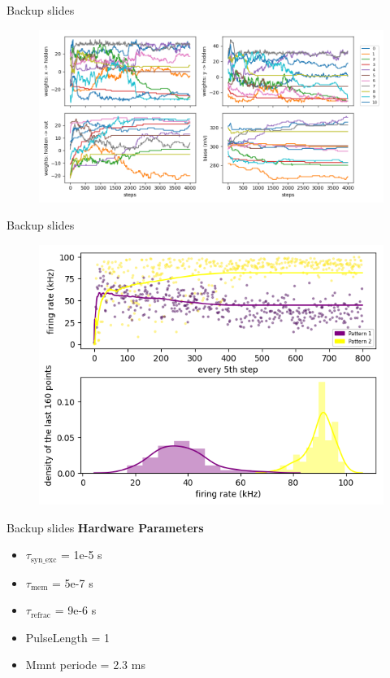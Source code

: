 \documentclass[12pt, aspectratio=169]{beamer}
\begin{document}
\appendix

\begin{frame}[fragile]{Backup slides}
\centering
        \begin{figure}
            \includegraphics[scale=0.5]{model_parameters.png}
            \label{fig:my_label}
        \end{figure}
\end{frame}

\begin{frame}[fragile]{Backup slides}
\centering
        \begin{figure}
            \includegraphics[scale=0.65]{rates_dist.png}
            \label{fig:my_label}
        \end{figure}
\end{frame}

\begin{frame}[fragile]{Backup slides}
\textbf{Hardware Parameters}
\begin{itemize}
    \item $\tau_{\text{syn\_exc}}$ = 1e-5 s
    \item $\tau_{\text{mem}}$ = 5e-7 s
    \item $\tau_{\text{refrac}}$ = 9e-6 s
    \item PulseLength = 1
    \item Mmnt periode = 2.3 ms
\end{itemize}
\end{frame}
  	
\end{document}
